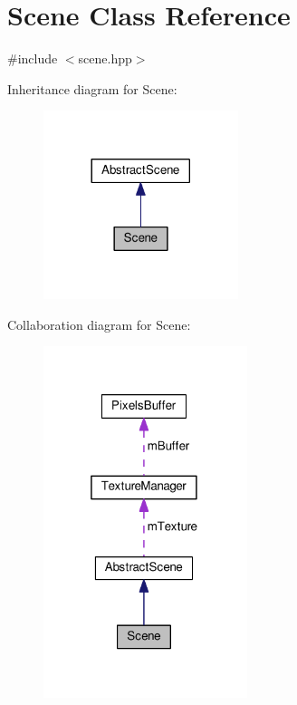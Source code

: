 \hypertarget{class_scene}{\section{Scene Class Reference}
\label{class_scene}
}


{\ttfamily \#include $<$scene.\+hpp$>$}



Inheritance diagram for Scene\+:
\nopagebreak
\begin{figure}[H]
\begin{center}
\leavevmode
\includegraphics[width=161pt]{class_scene__inherit__graph}
\end{center}
\end{figure}


Collaboration diagram for Scene\+:
\nopagebreak
\begin{figure}[H]
\begin{center}
\leavevmode
\includegraphics[width=169pt]{class_scene__coll__graph}
\end{center}
\end{figure}
